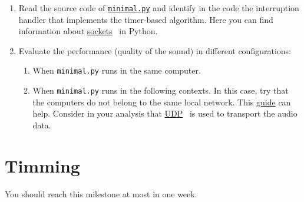 \begin{enumerate}

\item Read the source code of
  \href{https://github.com/Tecnologias-multimedia/intercom/blob/master/src/minimal.py}{\texttt{minimal.py}}
  and identify in the code the interruption handler that implements
  the timer-based algorithm. Here you can find information about
  \href{https://github.com/vicente-gonzalez-ruiz/YAPT/blob/master/03-IO/networking/sockets.ipynb}{sockets}~\cite{YAPT} in Python.
  
\item Evaluate the performance (quality of the sound) in different configurations:
  \begin{enumerate}
  \item When \verb|minimal.py| runs in the same computer.
  \item When \verb|minimal.py| runs in the following contexts. In this
    case, try that the computers do not belong to the same local
    network. This
    \href{https://www.noip.com/support/knowledgebase/general-port-forwarding-guide/}{guide}
    can help. Consider in your analysis that
    \href{https://en.wikipedia.org/wiki/User_Datagram_Protocol}{UDP}~\cite{UDP}
    is used to transport the audio data.
  \end{enumerate}
   
  
\end{enumerate}

\section{Timming}

You should reach this milestone at most in one week.

